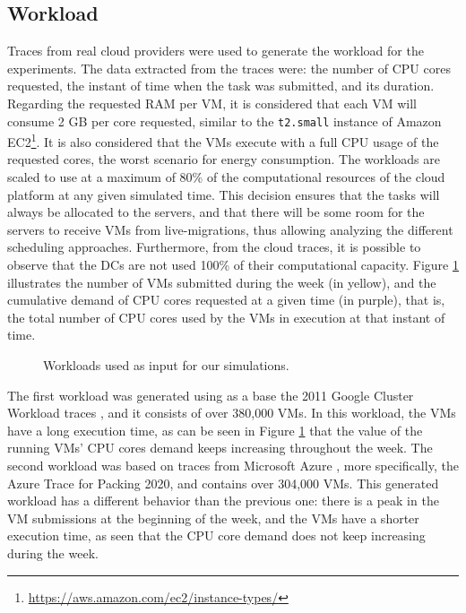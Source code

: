 \subsection{Workload}

Traces from real cloud providers were used to generate the workload for the experiments. The data extracted from the traces were: the number of CPU cores requested, the instant of time when the task was submitted, and its duration. Regarding the requested RAM per VM, it is considered that each VM will consume 2 GB per core requested, similar to the \texttt{t2.small} instance of Amazon EC2\footnote{\url{https://aws.amazon.com/ec2/instance-types/}}. It is also considered that the VMs execute with a full CPU usage of the requested cores, the worst scenario for energy consumption. The workloads are scaled to use at a maximum of 80\% of the computational resources of the cloud platform at any given simulated time. This decision ensures that the tasks will always be allocated to the servers, and that there will be some room for the servers to receive VMs from live-migrations, thus allowing analyzing the different scheduling approaches. Furthermore, from the cloud traces, it is possible to observe that the DCs are not used 100\% of their computational capacity. Figure \ref{fig:workload} illustrates the number of VMs submitted during the week (in yellow), and the cumulative demand of CPU cores requested at a given time (in purple), that is, the total number of CPU cores used by the VMs in execution at that instant of time. 

\begin{figure}[!htbp]
  \centering
   {}
  \caption{Workloads used as input for our simulations.}
  \label{fig:workload}
 \end{figure}

The first workload was generated using as a base the 2011 Google Cluster Workload traces \cite{google2011traces}, and it consists of over 380,000 VMs. In this workload, the VMs have a long execution time, as can be seen in Figure \ref{fig:workload} that the value of the running VMs' CPU cores demand keeps increasing throughout the week. The second workload was based on traces from Microsoft Azure \cite{hadary2020protean}, more specifically, the Azure Trace for Packing 2020, and contains over 304,000 VMs. This generated workload has a different behavior than the previous one: there is a peak in the VM submissions at the beginning of the week, and the VMs have a shorter execution time, as seen that the CPU core demand does not keep increasing during the week.


